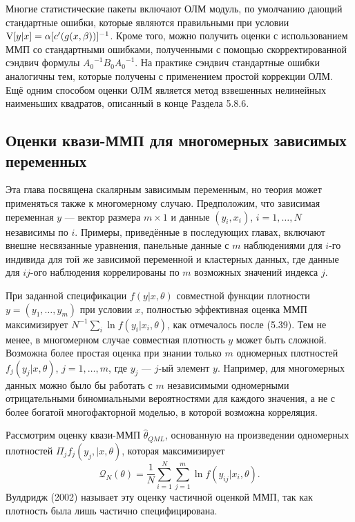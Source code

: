 Многие статистические пакеты включают ОЛМ модуль, по умолчанию дающий стандартные ошибки, которые являются правильными при условии $\mathrm{V}[y|x]=\alpha [c'(g(x,\beta))]^{-1}$. Кроме того, можно получить оценки с использованием ММП со стандартными ошибками, полученными с помощью скорректированной сэндвич формулы ${A_0}^{-1}B_0{A_0}^{-1}$. На практике сэндвич стандартные ошибки аналогичны тем, которые получены с применением простой коррекции ОЛМ. Ещё одним способом оценки ОЛМ является метод взвешенных нелинейных наименьших квадратов, описанный в конце Раздела 5.8.6.

\subsection{Оценки квази-ММП для многомерных зависимых переменных}

Эта глава посвящена скалярным зависимым переменным, но теория может применяться также к многомерному случаю. Предположим, что зависимая переменная $y$ --- вектор размера $m \times 1$ и данные $(y_i,x_i)$, $i=1,\dots, N$ независимы по $i$. Примеры, приведённые в последующих главах, включают внешне несвязанные уравнения, панельные данные с $m$ наблюдениями для $i$-го индивида для той же зависимой переменной и кластерных данных, где данные для $i j$-ого наблюдения коррелированы по $m$ возможных значений индекса $j$.

При заданной спецификации $f(y|x,\theta)$ совместной функции плотности $y=(y_1, \dots, y_m)$ при условии $x$, полностью эффективная оценка ММП максимизирует $N^{-1} \sum_i \ln f(y_i|x_i,\theta)$, как отмечалось после (5.39). Тем не менее, в многомерном случае совместная плотность $y$ может быть сложной. Возможна более простая оценка при знании только $m$ одномерных плотностей $f_j(y_j|x,\theta)$, $j=1,\dots,m$, где $y_j$ --- $j$-ый элемент $y$. Например, для многомерных данных можно было бы работать с $m$ независимыми одномерными отрицательными биномиальными вероятностями для каждого значения, а не с более богатой многофакторной моделью, в которой возможна корреляция.

Рассмотрим  оценку квази-ММП $\hat{\theta}_{QML}$, основанную на произведении одномерных плотностей $\Pi_j f_j(y_j,|x,\theta)$, которая максимизирует
\begin{equation}
\mathcal{Q}_{N}(\theta)=\frac{1}{N} \sum_{i=1}^{N} \sum_{j=1}^{m} \ln f(y_{ij}|x_i,\theta).
\end{equation}
Вулдридж (2002) называет эту оценку частичной оценкой ММП, так как плотность была лишь частично специфицирована. 

